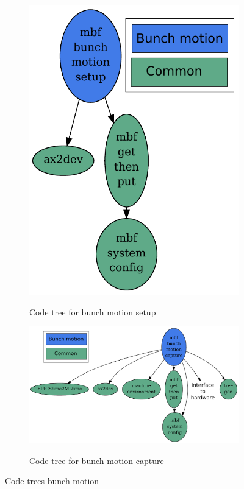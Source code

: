 \documentclass{report}
\begin{document}
\begin{figure}[hbt]
\centering
    \begin{subfigure}[b]{0.3\textwidth}
  \includegraphics[width=\textwidth]{mbf_bunch_motion_setup.pdf}\\
  \caption{Code tree for bunch motion setup}\label{fig:code_tree_bunch_motion_setup}
    \end{subfigure}
       \begin{subfigure}[b]{0.6\textwidth}
  \includegraphics[width=\textwidth]{mbf_bunch_motion_capture.pdf}\\
  \caption{Code tree for bunch motion capture}\label{fig:code_tree_bunch_motion_capture}
    \end{subfigure}
    \caption{Code trees bunch motion}\label{fig:growdamp_archival_code_trees}
\end{figure}
\end{document}
